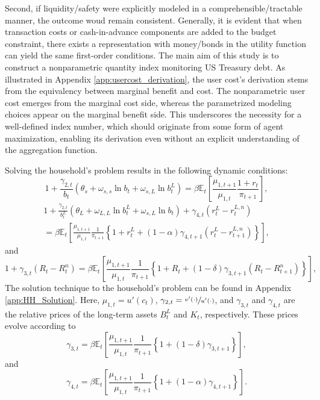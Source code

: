 \documentclass[11pt,a4paper,margin=1.5in]{article}
\begin{document}
Second, if liquidity/safety were explicitly modeled in a comprehensible/tractable manner, the outcome woud remain consistent. 
Generally, it is evident that when transaction costs or cash-in-advance components are added to the budget constraint, there exists a representation with money/bonds in the utility function can yield the same first-order conditions. 
The main aim of this study is to construct a nonparametric quantity index monitoring US Treasury debt. 
As illustrated in Appendix \ref{app:usercost_derivation}, the user cost's derivation stems from the equivalency between marginal benefit and cost. 
The nonparametric user cost emerges from the marginal cost side, whereas the parametrized modeling choices appear on the marginal benefit side. 
This underscores the necessity for a well-defined index number, which should originate from some form of agent maximization, enabling its derivation even without an explicit understanding of the aggregation function.

Solving the household's problem results in the following dynamic conditions:
\begin{equation}
	1 + \frac{\gamma_{2,t}}{b_t}\left(\theta_s + \omega_{s,s}\ln b_t + \omega_{s,L}\ln b^L_t\right) = \beta \mathbb{E}_t\!\left[\frac{\mu_{1,t+1}}{\mu_{1,t}}\frac{1+r_t}{\pi_{t+1}}\right],
	\label{eq:HH_manOC_B}
\end{equation}
%
\begin{multline}
	1 + \frac{\gamma_{2,t}}{b^L_t}\left(\theta_L + \omega_{L,L}\ln b^L_t + \omega_{s,L}\ln b_t\right) + \gamma_{4,t}\left(r^L_t-r^{L,n}_t\right) \\
	= \beta \mathbb{E}_t\!\left[\frac{\mu_{1,t+1}}{\mu_{1,t}}\frac{1}{\pi_{t+1}} \left\{ 1+r^L_t + (1-\alpha)\gamma_{4,t+1} \left(r^L_t-r^{L,n}_{t+1}\right)\right\}\right],
	\label{eq:HH_manOC_BL}
\end{multline}
%
and
\begin{equation}
	1 + \gamma_{3,t}\left(R_t - R^{n}_t\right)  = \beta\mathbb{E}_t\!\left[\frac{\mu_{1,t+1}}{\mu_{1,t}}\frac{1}{\pi_{t+1}}\left\{ 1 + R_{t} + (1-\delta)\gamma_{3,{t+1}}\left(R_{t} - R^{n}_{t+1}\right)\right\}\right],
	\label{eq:HH_manOC_K}
\end{equation}
The solution technique to the household's problem can be found in Appendix \ref{app:HH_Solution}.
Here, $\mu_{1,t} = u'(c_t)$, $\gamma_{2,t} = \sfrac{v'(\cdot)}{u'(\cdot)}$, and $\gamma_{3,t}$ and $\gamma_{4,t}$ are the relative prices of the long-term assets $B^L_t$ and $K_t$, respectively.
These prices evolve according to
\begin{equation}
	\gamma_{3,t} = \beta\mathbb{E}_t\!\left[\frac{\mu_{1,t+1}}{\mu_{1,t}}\frac{1}{\pi_{t+1}} \left\{1 + (1-\delta)\gamma_{3,{t+1}}\right\}\right],
	\label{eq:HH_manOC_R}
\end{equation}
%
and
\begin{equation}
	\gamma_{4,t} = \beta\mathbb{E}_t\!\left[\frac{\mu_{1,t+1}}{\mu_{1,t}}\frac{1}{\pi_{t+1}} \left\{1 + (1-\alpha)\gamma_{4,{t+1}}\right\}\right].
	\label{eq:HH_manOC_rL}
\end{equation}
\end{document}
